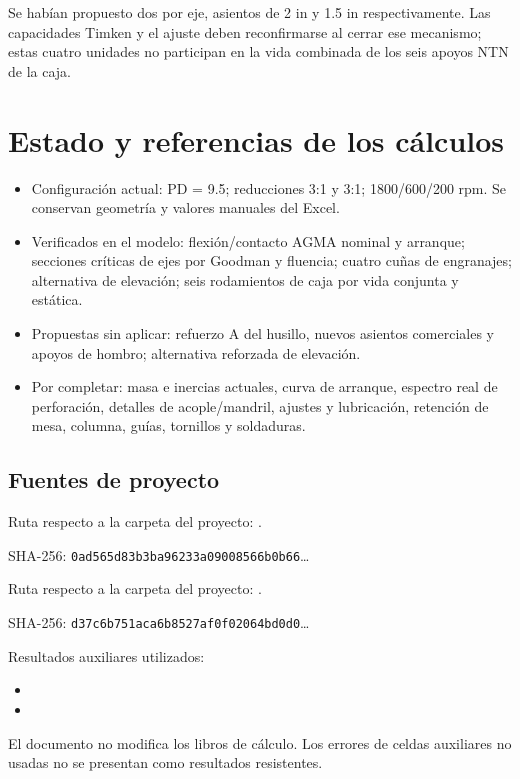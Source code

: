 \documentclass[11pt,a4paper]{article}
\begin{document}
Se habían propuesto dos por eje, asientos de 2 in y 1.5 in respectivamente. Las capacidades Timken y el ajuste deben reconfirmarse al cerrar ese mecanismo; estas cuatro unidades no participan en la vida combinada de los seis apoyos NTN de la caja.

\section{Estado y referencias de los cálculos}
\begin{itemize}
\item Configuración actual: PD = 9.5; reducciones 3:1 y 3:1; 1800/600/200 rpm. Se conservan geometría y valores manuales del Excel.
\item Verificados en el modelo: flexión/contacto AGMA nominal y arranque; secciones críticas de ejes por Goodman y fluencia; cuatro cuñas de engranajes; alternativa de elevación; seis rodamientos de caja por vida conjunta y estática.
\item Propuestas sin aplicar: refuerzo A del husillo, nuevos asientos comerciales y apoyos de hombro; alternativa reforzada de elevación.
\item Por completar: masa e inercias actuales, curva de arranque, espectro real de perforación, detalles de acople/mandril, ajustes y lubricación, retención de mesa, columna, guías, tornillos y soldaduras.
\end{itemize}

\subsection*{Fuentes de proyecto}

Ruta respecto a la carpeta del proyecto: .

SHA-256: \texttt{0ad565d83b3ba96233a09008566b0b66}\ldots

Ruta respecto a la carpeta del proyecto: .

SHA-256: \texttt{d37c6b751aca6b8527af0f02064bd0d0}\ldots

Resultados auxiliares utilizados:
\begin{itemize}
\item {}
\item {}
\end{itemize}
El documento no modifica los libros de cálculo. Los errores de celdas auxiliares no usadas no se presentan como resultados resistentes.
\end{document}
